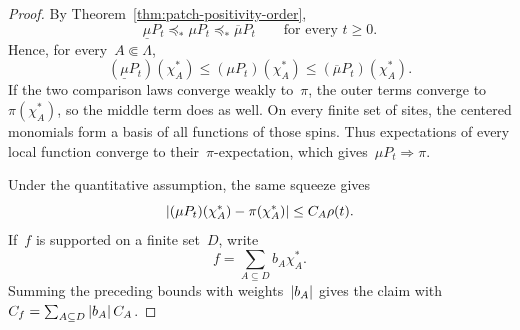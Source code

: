 \begin{proof}
By Theorem~\ref{thm:patch-positivity-order},
\begin{equation*}
\underline\mu P_t\preceq_*\mu P_t\preceq_*\overline\mu P_t
\qquad\text{for every }t\geq0.
\end{equation*}
Hence, for every~$A\Subset\Lambda$,
\begin{equation*}
(\underline\mu P_t)(\chi_A^*)
\leq
(\mu P_t)(\chi_A^*)
\leq
(\overline\mu P_t)(\chi_A^*).
\end{equation*}
If the two comparison laws converge weakly to~$\pi$, the outer terms converge
to~$\pi(\chi_A^*)$, so the middle term does as well. On every finite set of
sites, the centered monomials form a basis of all functions of those spins.
Thus expectations of every local function converge to their~$\pi$-expectation,
which gives~$\mu P_t\Rightarrow\pi$.

Under the quantitative assumption, the same squeeze gives
\begin{equation*}
\left|(\mu P_t)(\chi_A^*)-\pi(\chi_A^*)\right|
\leq
C_A\rho(t).
\end{equation*}
If~$f$ is supported on a finite set~$D$, write
\begin{equation*}
f=\sum_{A\subseteq D}b_A\chi_A^*.
\end{equation*}
Summing the preceding bounds with weights~$\left|b_A\right|$ gives the claim with
$C_f=\sum_{A\subseteq D}\left|b_A\right|C_A$.
\end{proof}
